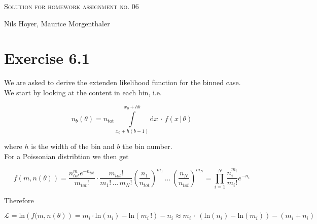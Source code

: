 \documentclass[10pt]{article}
\newenvironment{myfont}{\fontfamily{put}\selectfont}{\par}
\begin{document}
\begin{myfont}

\begin{center}
  \begin{Large}
    \textsc{Solution for homework assignment no. 06} \\
  \end{Large}
	\vspace*{0.4cm}
    Nils Hoyer, Maurice Morgenthaler
  \vspace*{1cm}
\end{center}

\section*{Exercise 6.1}

We are asked to derive the extenden likelihood function for the binned case. \\

\noindent We start by looking at the content in each bin, i.e.

\begin{equation}
n_{b}(\theta) = n_{\textrm{tot}} \int\limits_{x_{0} + h(b-1)}^{x_{0} + hb} \textrm{d}x \,\cdot\, f(x \,|\, \theta)
\end{equation}

\noindent where $h$ is the width of the bin and $b$ the bin number. \\
For a Poissonian distribtion we then get

\begin{equation}
f(m, n(\theta)) = \frac{n_{tot}^{m}e^{-n_{tot}}}{m_{tot}!} \cdot \frac{m_{tot}!}{m_{1}!\,...\, m_{N}!} \left(\frac{n_{1}}{n_{tot}}\right)^{m_{1}} \,...\, \left(\frac{n_{N}}{n_{tot}}\right)^{m_{N}} = \prod_{i = 1}^{N}\frac{n_{i}^{m_{i}}}{m_{i}!}e^{-n_{i}}
\end{equation}

\noindent Therefore

\begin{equation}
\mathcal{L} = \textrm{ln}\left(f(m, n(\theta)\right) = m_{i}\cdot \textrm{ln} \left(n_{i}\right) - \textrm{ln}\left(m_{i}\,!\right) - n_{i} \approx m_{i} \,\cdot\, \left(\textrm{ln}(n_{i}) - \textrm{ln}(m_{i})\right) - (m_{i} + n_{i})
\end{equation}


\end{myfont}
\end{document}
